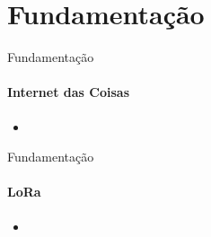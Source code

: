 \section{Fundamentação}
\begin{frame}{Fundamentação}
  \framesubtitle{Internet das Coisas}
  
  \begin{itemize}
    \item 
  \end{itemize}
\end{frame}

\begin{frame}{Fundamentação}
  \framesubtitle{LoRa}
  
  \begin{itemize}
    \item 
  \end{itemize}
\end{frame}